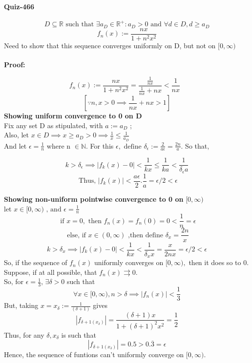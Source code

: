 \documentclass[20pt]{extarticle} %
\begin{document}
\paragraph{Quiz-466}

\[D \subseteq \mathbb{R} \text{ such that } \exists a_D \in \mathbb{R^+}: a_D >0 \text{ and }  \forall d \in D, d \geq a_D    \]
\[  f_n(x):= \frac{nx}{1+n^2x^2}   \]
Need to show that this sequence converges uniformly on D, but not on $[0,\infty)$\\\\
\textbf{Proof:}

	\[  f_n(x):= \frac{nx}{1+n^2x^2}= \frac {\frac{1}{nx}}{ \frac{1}{nx}+nx}< \frac{1}{nx} \text{   } \]
	\[ [    \because n,x>0 \implies \frac{1}{nx}+nx>1 ] \]
\textbf{Showing uniform convergence to 0 on D}\\
	Fix any set D as stipulated, with $a:=a_D$ ;
	\\Also, let $x \in D \implies x \geq a_D >0 \implies \frac{1}{x} \leq \frac{1}{a_D}  $ \\
	And let $\epsilon = \frac{1}{n}$ where n $\in \mathbb{N}$.
	For this $\epsilon, \text{ define }  \delta_\epsilon:= \frac{2}{a\epsilon} = \frac{2n}{a} $. So that,

	\[ k> \delta_\epsilon \implies |f_k(x)-0|< \frac{1}{kx} \leq \frac{1}{ka}  < \frac{1}{\delta_\epsilon a}\]
	\[ \text{ Thus, } |f_k(x)|< \frac{a\epsilon}{2} . \frac{1}{a}=\epsilon/2<\epsilon \]
\newpage

\textbf{Showing non-uniform pointwise convergence to 0 on }$[0,\infty)$\\
let $x\in[ 0,\infty) \text{ , and } \epsilon= \frac{1}{n}$ \\
	\[ \text{ if } x=0, \text{ then } f_n(x)=f_n(0)=0< \frac{1}{n}=\epsilon  \]
\[\text{ else, if }x \in (0,\infty) \text{ ,then define }\delta_x= \frac{2n}{x} \]
\[ k> \delta_x \implies |f_k(x)-0|< \frac{1}{kx}  < \frac{1}{\delta_x x}= \frac{x}{2nx}=\epsilon/2< \epsilon \]
So, if the sequence of $f_n(x)$ uniformly converges on $[0,\infty),$ then it does so to 0. Suppose, if at all possible, that $f_n(x) \rightrightarrows 0$.\\
So, for $\epsilon= \frac{1}{3} $, $\exists \delta>0$ such that
\[ \forall x \in[0,\infty), n>\delta \implies |f_n(x)|< \frac{1}{3} \]
But, taking $x = x_\delta := \frac{1}{(\delta+1)} $ gives
\[|f_{\delta+1(x_\delta)}|= \frac{(\delta+1)x}{1+(\delta +1)^2x^2}= \frac{1}{2} \]%
Thus, for any $\delta, x_\delta$ is such that
\[ |f_{\delta+1(x_\delta)}|= 0.5 > 0.\overline{3} = \epsilon \]
Hence, the sequence of funtions can't uniformly converge on $[0,\infty)$.
\end{document}
